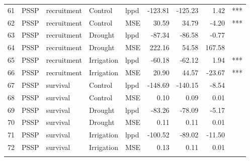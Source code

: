 \begin{longtable}{rllllrrrl}
  61 & PSSP & recruitment & Control & lppd & -123.81 & -125.23 & 1.42 & *** \\ 
  62 & PSSP & recruitment & Control & MSE & 30.59 & 34.79 & -4.20 & *** \\ 
  63 & PSSP & recruitment & Drought & lppd & -87.34 & -86.58 & -0.77 &  \\ 
  64 & PSSP & recruitment & Drought & MSE & 222.16 & 54.58 & 167.58 &  \\ 
  65 & PSSP & recruitment & Irrigation & lppd & -60.18 & -62.12 & 1.94 & *** \\ 
  66 & PSSP & recruitment & Irrigation & MSE & 20.90 & 44.57 & -23.67 & *** \\ 
  67 & PSSP & survival & Control & lppd & -148.69 & -140.15 & -8.54 &  \\ 
  68 & PSSP & survival & Control & MSE & 0.10 & 0.09 & 0.01 &  \\ 
  69 & PSSP & survival & Drought & lppd & -83.26 & -78.09 & -5.17 &  \\ 
  70 & PSSP & survival & Drought & MSE & 0.11 & 0.11 & 0.01 &  \\ 
  71 & PSSP & survival & Irrigation & lppd & -100.52 & -89.02 & -11.50 &  \\ 
  72 & PSSP & survival & Irrigation & MSE & 0.13 & 0.11 & 0.01 &  \\ 
  \hline
\label{table:treatmentPreds}
\end{longtable}
